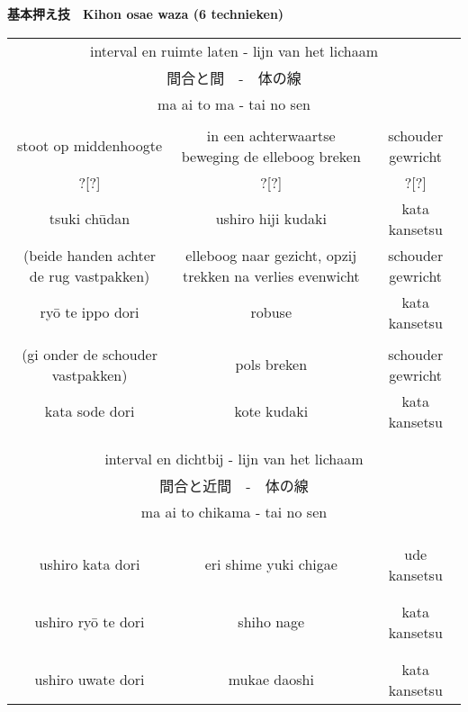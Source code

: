 \documentclass[a4paper,12pt]{article}
\begin{document}
\begin{CJK}{UTF8}{min}
\newpage
\thispagestyle{empty} %
\begin{landscape}
\begin{center}
    \textbf{基本押え技　Kihon osae waza (6 technieken)}
\end{center}
\begin{table}[H]
\begin{center}
\small
\begin{tabular}{ccc}
\multicolumn{3}{c}{interval en ruimte laten - lijn van het lichaam}\\
\multicolumn{3}{c}{間合と間　-　体の線}\\
\multicolumn{3}{c}{ma ai to ma - tai no sen}\\
\\
stoot op middenhoogte & in een achterwaartse beweging de elleboog breken & schouder gewricht\\
?[?] & ?[?] & ?[?]\\
tsuki ch\={u}dan & ushiro hiji kudaki & kata kansetsu
\\
(beide handen achter de rug vastpakken) & elleboog naar gezicht, opzij trekken na verlies evenwicht & schouder gewricht\\
ry\={o} te ippo dori & robuse & kata kansetsu\\
\\
(gi onder de schouder vastpakken) & pols breken & schouder gewricht\\
kata sode dori & kote kudaki & kata kansetsu\\
\\
\hline
\\
\multicolumn{3}{c}{interval en dichtbij - lijn van het lichaam}\\
\multicolumn{3}{c}{間合と近間　-　体の線}\\
\multicolumn{3}{c}{ma ai to chikama - tai no sen}\\
\\
\\
\\
ushiro kata dori & eri shime yuki chigae & ude kansetsu\\
\\
\\
ushiro ry\={o} te dori& shiho nage & kata kansetsu\\
\\
\\
ushiro uwate dori & mukae daoshi & kata kansetsu
\end{tabular}
\end{center}
\label{kihonosaewaza}
\end{table}
\end{landscape}


\end{CJK}
\end{document}
